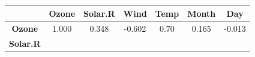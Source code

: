\documentclass[]{article}
\theoremstyle{definition}
\theoremstyle{definition}
\theoremstyle{definition}
\theoremstyle{remark}
\begin{document}
\begin{longtable}[]{@{}ccccccc@{}}
\toprule
\begin{minipage}[b]{0.16\columnwidth}\centering\strut
~\strut
\end{minipage} & \begin{minipage}[b]{0.10\columnwidth}\centering\strut
Ozone\strut
\end{minipage} & \begin{minipage}[b]{0.11\columnwidth}\centering\strut
Solar.R\strut
\end{minipage} & \begin{minipage}[b]{0.10\columnwidth}\centering\strut
Wind\strut
\end{minipage} & \begin{minipage}[b]{0.09\columnwidth}\centering\strut
Temp\strut
\end{minipage} & \begin{minipage}[b]{0.10\columnwidth}\centering\strut
Month\strut
\end{minipage} & \begin{minipage}[b]{0.10\columnwidth}\centering\strut
Day\strut
\end{minipage}\tabularnewline
\midrule
\endhead
\begin{minipage}[t]{0.16\columnwidth}\centering\strut
\textbf{Ozone}\strut
\end{minipage} & \begin{minipage}[t]{0.10\columnwidth}\centering\strut
1.000\strut
\end{minipage} & \begin{minipage}[t]{0.11\columnwidth}\centering\strut
0.348\strut
\end{minipage} & \begin{minipage}[t]{0.10\columnwidth}\centering\strut
-0.602\strut
\end{minipage} & \begin{minipage}[t]{0.09\columnwidth}\centering\strut
0.70\strut
\end{minipage} & \begin{minipage}[t]{0.10\columnwidth}\centering\strut
0.165\strut
\end{minipage} & \begin{minipage}[t]{0.10\columnwidth}\centering\strut
-0.013\strut
\end{minipage}\tabularnewline
\begin{minipage}[t]{0.16\columnwidth}\centering\strut
\textbf{Solar.R}\strut
\end{minipage} & \begin{minipage}[t]{0.10\columnwidth}\centering\strut

\end{minipage}
\end{longtable}
\end{document}
